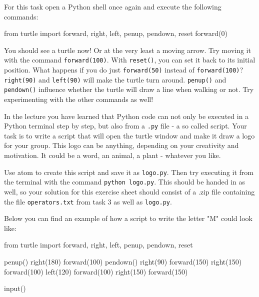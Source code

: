 For this task open a Python shell once again and execute the following commands:

\begin{pythoncode}

from turtle import forward, right, left, penup, pendown, reset
forward(0)

\end{pythoncode}

\noindent You should see a turtle now! Or at the very least a moving arrow. Try moving it with the command \texttt{forward(100)}.
With \texttt{reset()}, you can set it back to its initial position. What happens if you do just \texttt{forward(50)} instead of \texttt{forward(100)}?
\texttt{right(90)} and \texttt{left(90)} will make the turtle turn around. \texttt{penup()} and \texttt{pendown()} influence whether the turtle will draw a line when walking or not. Try experimenting with the other commands as well!

\vspace{1em}

\noindent In the lecture you have learned that Python code can not only be executed in a Python terminal step by step, but also from a \texttt{.py} file - a so called script. Your task is to write a script that will open the turtle window and make it draw a logo for your group. This logo can be anything, depending on your creativity and motivation. It could be a word, an animal, a plant - whatever you like.

\vspace{1em}

\noindent Use atom to create this script and save it as \texttt{logo.py}. Then try executing it from the terminal with the command \texttt{python logo.py}. This should be handed in as well, so your solution for this exercise sheet should consist of a .zip file containing the file \texttt{operators.txt} from task 3 as well as \texttt{logo.py}.

\noindent Below you can find an example of how a script to write the letter "M" could look like:

\begin{pythoncode}

from turtle import forward, right, left, penup, pendown, reset

penup()
right(180)
forward(100)
pendown()
right(90)
forward(150)
right(150)
forward(100)
left(120)
forward(100)
right(150)
forward(150)

input()

\end{pythoncode}

